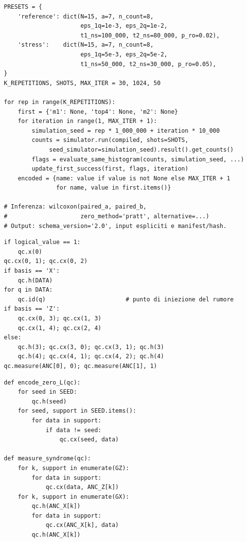 \begin{lstlisting}[caption={Orchestrazione appaiata delle sole campagne rumorose N15}, label={lst:schema_di_orchestrazione_degli}]
PRESETS = {
    'reference': dict(N=15, a=7, n_count=8,
                      eps_1q=1e-3, eps_2q=1e-2,
                      t1_ns=100_000, t2_ns=80_000, p_ro=0.02),
    'stress':    dict(N=15, a=7, n_count=8,
                      eps_1q=5e-3, eps_2q=5e-2,
                      t1_ns=50_000, t2_ns=30_000, p_ro=0.05),
}
K_REPETITIONS, SHOTS, MAX_ITER = 30, 1024, 50

for rep in range(K_REPETITIONS):
    first = {'m1': None, 'top4': None, 'm2': None}
    for iteration in range(1, MAX_ITER + 1):
        simulation_seed = rep * 1_000_000 + iteration * 10_000
        counts = simulator.run(compiled, shots=SHOTS,
             seed_simulator=simulation_seed).result().get_counts()
        flags = evaluate_same_histogram(counts, simulation_seed, ...)
        update_first_success(first, flags, iteration)
    encoded = {name: value if value is not None else MAX_ITER + 1
               for name, value in first.items()}

# Inferenza: wilcoxon(paired_a, paired_b,
#                     zero_method='pratt', alternative=...)
# Output: schema_version='2.0', input espliciti e manifest/hash.
\end{lstlisting}

\begin{lstlisting}[caption={Codifica ed estrazione di sindrome del codice a ripetizione.}, label={lst:qec_repetition}]
if logical_value == 1:
    qc.x(0)
qc.cx(0, 1); qc.cx(0, 2)
if basis == 'X':
    qc.h(DATA)
for q in DATA:
    qc.id(q)                       # punto di iniezione del rumore
if basis == 'Z':
    qc.cx(0, 3); qc.cx(1, 3)
    qc.cx(1, 4); qc.cx(2, 4)
else:
    qc.h(3); qc.cx(3, 0); qc.cx(3, 1); qc.h(3)
    qc.h(4); qc.cx(4, 1); qc.cx(4, 2); qc.h(4)
qc.measure(ANC[0], 0); qc.measure(ANC[1], 1)
\end{lstlisting}

\begin{lstlisting}[caption={Preparazione di $\ket{0_L}$ e misura degli stabilizzatori di Steane.}, label={lst:qec_steane}]
def encode_zero_L(qc):
    for seed in SEED:
        qc.h(seed)
    for seed, support in SEED.items():
        for data in support:
            if data != seed:
                qc.cx(seed, data)

def measure_syndrome(qc):
    for k, support in enumerate(GZ):
        for data in support:
            qc.cx(data, ANC_Z[k])
    for k, support in enumerate(GX):
        qc.h(ANC_X[k])
        for data in support:
            qc.cx(ANC_X[k], data)
        qc.h(ANC_X[k])
\end{lstlisting}

